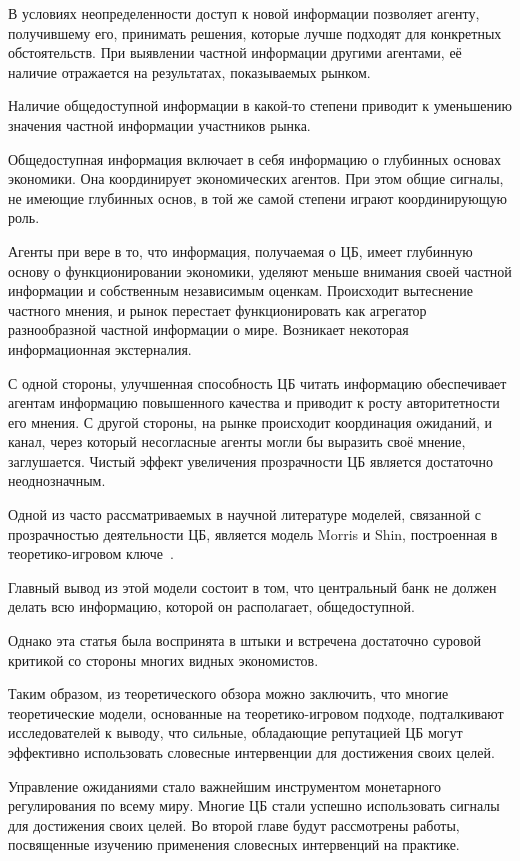 \documentclass[14pt,a4paper, oneside]{extreport}
\theoremstyle{plain}              %
\theoremstyle{definition}         %
\begin{document}
В условиях неопределенности доступ к новой информации позволяет агенту, получившему его, принимать решения, которые лучше подходят для конкретных обстоятельств. При выявлении частной информации другими агентами, её наличие отражается на результатах, показываемых рынком.

Наличие общедоступной информации в какой-то степени приводит к уменьшению значения частной информации участников рынка.

Общедоступная информация включает в себя информацию о глубинных основах экономики. Она координирует экономических агентов. При этом общие сигналы, не имеющие глубинных основ, в той же самой степени играют координирующую роль. 

Агенты при вере в то, что информация, получаемая о ЦБ, имеет глубинную основу о функционировании
экономики, уделяют меньше внимания своей частной информации и собственным независимым оценкам. Происходит вытеснение частного мнения, и рынок перестает функционировать как агрегатор разнообразной частной информации о мире. Возникает некоторая информационная экстерналия. 

С одной стороны, улучшенная способность ЦБ читать информацию обеспечивает агентам информацию повышенного качества и приводит к росту авторитетности его мнения. С другой стороны, на рынке происходит координация ожиданий, и канал, через который несогласные агенты могли бы выразить своё мнение, заглушается. Чистый эффект увеличения прозрачности ЦБ является достаточно неоднозначным. 

Одной из часто рассматриваемых в научной литературе моделей, связанной с прозрачностью деятельности ЦБ, является модель Morris и Shin, построенная в теоретико-игровом ключе~\cite{morris2005central}.

Главный вывод из этой модели состоит в том, что центральный банк не должен делать всю информацию, которой он располагает, общедоступной. 

Однако эта статья была воспринята в штыки и встречена достаточно суровой критикой со стороны многих видных экономистов. 

Таким образом, из теоретического обзора можно заключить, что многие теоретические модели, основанные на теоретико-игровом подходе, подталкивают исследователей к выводу, что сильные, обладающие репутацией ЦБ могут эффективно использовать словесные интервенции для достижения своих целей.

Управление ожиданиями стало важнейшим инструментом монетарного регулирования по всему миру. Многие ЦБ стали успешно использовать сигналы для достижения своих целей. Во второй главе будут рассмотрены работы, посвященные изучению применения словесных интервенций на практике.
\end{document}

